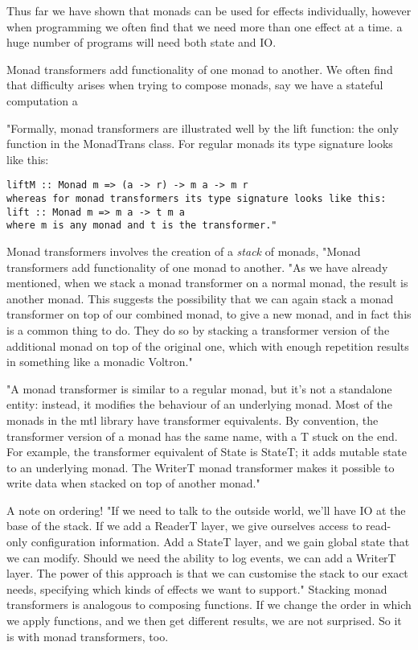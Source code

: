 Thus far we have shown that monads can be used for effects individually,
however when programming we often find that we need more than one effect
at a time. a huge number of programs will need both state
and IO.

Monad transformers add functionality of one monad to another.
We often find that difficulty arises when trying to compose monads,
say we have a stateful computation a

"Formally, monad transformers are illustrated well by the lift function:
the only function in the MonadTrans class.
For regular monads its type signature looks like this:

\begin{verbatim}
liftM :: Monad m => (a -> r) -> m a -> m r
whereas for monad transformers its type signature looks like this:
lift :: Monad m => m a -> t m a
where m is any monad and t is the transformer."
\end{verbatim}

Monad transformers involves
the creation of a \textit{stack} of monads,
"Monad transformers add functionality of one monad to another.
"As we have already mentioned, when we stack a monad transformer on a normal monad,
the result is another monad.
This suggests the possibility that we can again stack a monad transformer on top of our combined monad,
to give a new monad,
and in fact this is a common thing to do.
They do so by stacking a transformer version of the additional monad
on top of the original one, which with enough repetition results in something like a monadic Voltron."

"A monad transformer is similar to a regular monad,
but it's not a standalone entity: instead,
it modifies the behaviour of an underlying monad.
Most of the monads in the mtl library have transformer equivalents.
By convention, the transformer version of a monad has the same name,
with a T stuck on the end.
For example, the transformer equivalent of State is StateT;
it adds mutable state to an underlying monad.
The WriterT monad transformer makes it possible to write data when stacked on top of another monad."


A note on ordering!
"If we need to talk to the outside world, we'll have IO at the base of the stack.
If we add a ReaderT layer, we give ourselves access to read-only configuration information.
Add a StateT layer, and we gain global state that we can modify.
Should we need the ability to log events, we can add a WriterT layer.
The power of this approach is that we can customise the stack to our exact needs,
specifying which kinds of effects we want to support."
Stacking monad transformers is analogous to composing functions.
If we change the order in which we apply functions, and we then get different results, we are not surprised. So it is with monad transformers, too.

